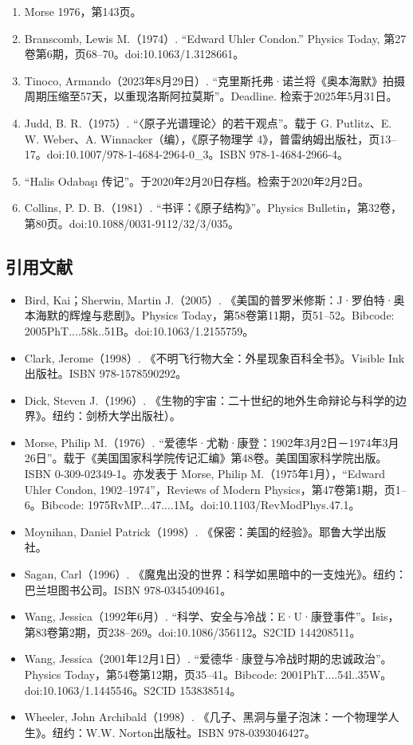 \begin{enumerate}
\item Morse 1976，第143页。
\item Branscomb, Lewis M.（1974）. “Edward Uhler Condon.” Physics Today, 第27卷第6期，页68–70。doi:10.1063/1.3128661。
\item Tinoco, Armando（2023年8月29日）. “克里斯托弗·诺兰将《奥本海默》拍摄周期压缩至57天，以重现洛斯阿拉莫斯”。Deadline. 检索于2025年5月31日。
\item Judd, B. R.（1975）. “〈原子光谱理论〉的若干观点”。载于 G. Putlitz、E. W. Weber、A. Winnacker（编），《原子物理学 4》，普雷纳姆出版社，页13–17。doi:10.1007/978-1-4684-2964-0_3。ISBN 978-1-4684-2966-4。
\item “Halis Odabaşı 传记”。于2020年2月20日存档。检索于2020年2月2日。
\item Collins, P. D. B.（1981）. “书评：《原子结构》”。Physics Bulletin，第32卷，第80页。doi:10.1088/0031-9112/32/3/035。
\end{enumerate}
\subsection{引用文献}
\begin{itemize}
\item Bird, Kai；Sherwin, Martin J.（2005）. 《美国的普罗米修斯：J·罗伯特·奥本海默的辉煌与悲剧》。Physics Today，第58卷第11期，页51–52。Bibcode: 2005PhT....58k..51B。doi:10.1063/1.2155759。
\item Clark, Jerome（1998）. 《不明飞行物大全：外星现象百科全书》。Visible Ink出版社。ISBN 978-1578590292。
\item Dick, Steven J.（1996）. 《生物的宇宙：二十世纪的地外生命辩论与科学的边界》。纽约：剑桥大学出版社）。
\item Morse, Philip M.（1976）. “爱德华·尤勒·康登：1902年3月2日－1974年3月26日”。载于《美国国家科学院传记汇编》第48卷。美国国家科学院出版。ISBN 0-309-02349-1。亦发表于 Morse, Philip M.（1975年1月），“Edward Uhler Condon, 1902–1974”，Reviews of Modern Physics，第47卷第1期，页1–6。Bibcode: 1975RvMP...47....1M。doi:10.1103/RevModPhys.47.1。
\item Moynihan, Daniel Patrick（1998）. 《保密：美国的经验》。耶鲁大学出版社。
\item Sagan, Carl（1996）. 《魔鬼出没的世界：科学如黑暗中的一支烛光》。纽约：巴兰坦图书公司。ISBN 978-0345409461。
\item Wang, Jessica（1992年6月）. “科学、安全与冷战：E·U·康登事件”。Isis，第83卷第2期，页238–269。doi:10.1086/356112。S2CID 144208511。
\item Wang, Jessica（2001年12月1日）. “爱德华·康登与冷战时期的忠诚政治”。Physics Today，第54卷第12期，页35–41。Bibcode: 2001PhT....54l..35W。doi:10.1063/1.1445546。S2CID 153838514。
\item Wheeler, John Archibald（1998）. 《几子、黑洞与量子泡沫：一个物理学人生》。纽约：W.W. Norton出版社。ISBN 978-0393046427。
\end{itemize}
